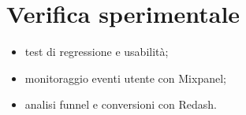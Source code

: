 \chapter{Verifica sperimentale}
\begin{itemize}
  \item test di regressione e usabilità;
  \item monitoraggio eventi utente con Mixpanel;
  \item analisi funnel e conversioni con Redash.
\end{itemize}